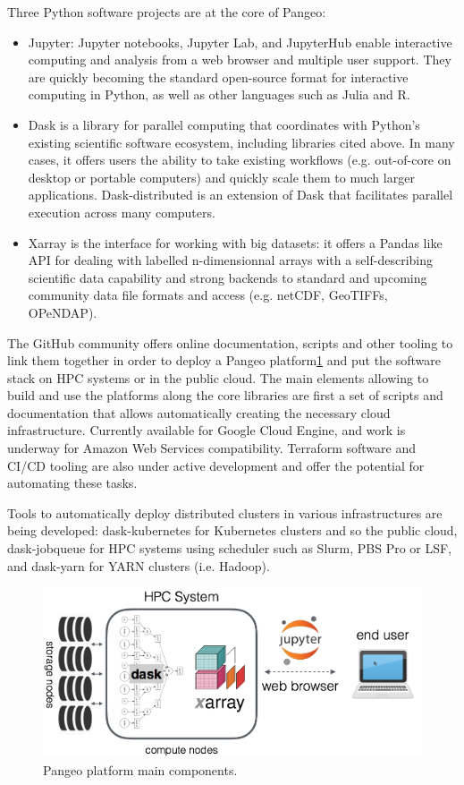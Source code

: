 \documentclass{article}
\begin{document}
Three Python software projects are at the core of Pangeo:
\begin{itemize}
\item Jupyter: Jupyter notebooks, Jupyter Lab, and JupyterHub enable interactive computing and analysis from a web browser and multiple user support. They are quickly becoming the standard open-source format for interactive computing in Python, as well as other languages such as Julia and R.
\item Dask is a library for parallel computing that coordinates with Python’s existing scientific software ecosystem, including libraries cited above. In many cases, it offers users the ability to take existing workflows (e.g. out-of-core on desktop or portable computers) and quickly scale them to much larger applications. Dask-distributed is an extension of Dask that facilitates parallel execution across many computers.
\item Xarray is the interface for working with big datasets: it offers a Pandas like API for dealing with labelled n-dimensionnal arrays with a self-describing scientific data capability and strong backends to standard and upcoming community data file formats and access (e.g. netCDF, GeoTIFFs, OPeNDAP).
\end{itemize}

The GitHub community offers online documentation, scripts and other tooling to link them together in order to deploy a Pangeo platform\ref{pangeo_stack} and put the software stack on HPC systems or in the public cloud. The main elements allowing to build and use the platforms along the core libraries are first a set of scripts and documentation that allows automatically creating the necessary cloud infrastructure. Currently available for Google Cloud Engine, and work is underway for Amazon Web Services compatibility. Terraform software and CI/CD tooling are also under active development and offer the potential for automating these tasks.

Tools to automatically deploy distributed clusters in various infrastructures are being developed: dask-kubernetes for Kubernetes clusters and so the public cloud, dask-jobqueue\cite{b4} for HPC systems using scheduler such as Slurm, PBS Pro or LSF, and dask-yarn for YARN clusters (i.e. Hadoop).

\begin{figure}
  \centering
  \includegraphics[width=\columnwidth]{pangeo_stack.png}
  \caption{\label{pangeo_stack} Pangeo platform main components.}
\end{figure}
\end{document}
